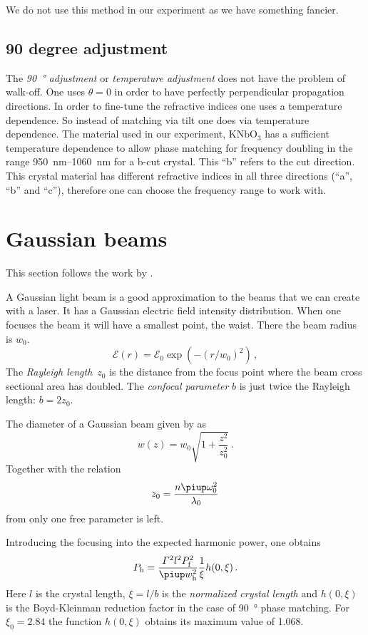 \documentclass[11pt, english, fleqn, DIV=15, headinclude, BCOR=2cm]{scrreprt}
\begin{document}
We do not use this method in our experiment as we have something fancier.

\subsection{90 degree adjustment}

The \emph{\SI{90}{\degree} adjustment} or \emph{temperature adjustment} does
not have the problem of walk-off. One uses $\theta = 0$ in order to have
perfectly perpendicular propagation directions. In order to fine-tune the
refractive indices one uses a temperature dependence. So instead of matching
via tilt one does via temperature dependence. The material used in our
experiment, $\mathrm{KNbO_3}$ has a sufficient temperature dependence to allow
phase matching for frequency doubling in the range
\SIrange{950}{1060}{\nano\meter} for a b-cut crystal. This \enquote b refers to
the cut direction. This crystal material has different refractive indices in
all three directions (\enquote a, \enquote b and \enquote c), therefore one can
choose the frequency range to work with.

\section{Gaussian beams}

This section follows the work by
\textcite[Section~12.4.4]{meschede/optik_licht_laser/2008}.

A Gaussian light beam is a good approximation to the beams that we can create
with a laser. It has a Gaussian electric field intensity distribution. When one
focuses the beam it will have a smallest point, the waist. There the beam
radius is $w_0$.
\[
    \mathcal E(r) = \mathcal E_0 \exp(-(r/w_0)^2) \,,
\]
The \emph{Rayleigh length}~$z_0$ is the distance from the focus point where the
beam cross sectional area has doubled. The \emph{confocal parameter} $b$ is
just twice the Rayleigh length: $b = 2 z_0$.

The diameter of a Gaussian beam given by \parencite{wikipedia/gaussian_beam} as
\[
    w(z) = w_0 \sqrt{1 + \frac{z^2}{z_0^2}} \,.
\]
Together with the relation
\[
    z_0 = \frac{n \piup \omega_0^2}{\lambda_0}
\]
from \parencite{wikipedia/rayleighleange} only one free parameter is left.

Introducing the focusing into the expected harmonic power, one obtains
\[
    P_\mathrm h
    = \frac{\Gamma^2 l^2 P_\mathrm f^2}{\piup w_\mathrm h^2} \frac1\xi h(0,
    \xi) \,.
\]
Here $l$ is the crystal length, $\xi = l / b$ is the \emph{normalized crystal
length} and $h(0, \xi)$ is the Boyd-Kleinman reduction factor in the case of
\SI{90}{\degree} phase matching. For $\xi_0 = 2.84$ the function $h(0, \xi)$
obtains its maximum value of \num{1.068}.
\end{document}
